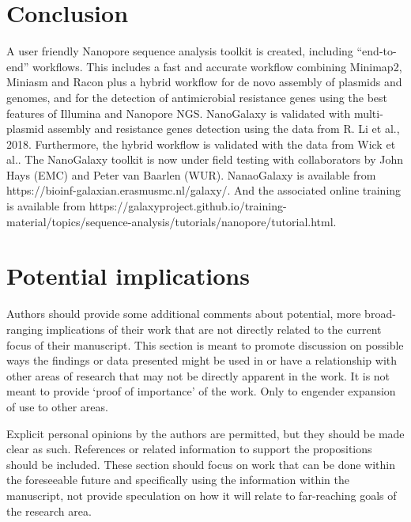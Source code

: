 \documentclass[a4paper,num-refs]{oup-contemporary}
\begin{document}
\section{Conclusion}

A user friendly Nanopore sequence analysis toolkit is created, including “end-to-end” workflows. This includes a fast and accurate workflow combining Minimap2, Miniasm and Racon plus a hybrid workflow for de novo assembly of plasmids and genomes, and for the detection of antimicrobial resistance genes using the best features of Illumina and Nanopore NGS. NanoGalaxy is validated with multi-plasmid assembly and resistance genes detection using the data from R. Li et al., 2018. Furthermore, the hybrid workflow is validated with the data from Wick et al.. The NanoGalaxy toolkit is now under field testing with collaborators by John Hays (EMC) and Peter van Baarlen (WUR). NanaoGalaxy is available from https://bioinf-galaxian.erasmusmc.nl/galaxy/. And the associated online training is available from https://galaxyproject.github.io/training-material/topics/sequence-analysis/tutorials/nanopore/tutorial.html.


\section{Potential implications}

Authors should provide some additional comments about potential, more broad-ranging implications of their work that are not directly related to the current focus of their manuscript. This section is meant to promote discussion on possible ways the findings or data presented might be used in or have a relationship with other areas of research that may not be directly apparent in the work. It is not meant to provide `proof of importance' of the work. Only to engender expansion of use to other areas.

Explicit personal opinions by the authors are permitted, but they should be made clear as such. References or related information to support the propositions should be included. These section should focus on work that can be done within the foreseeable future and specifically using the information within the manuscript, not provide speculation on how it will relate to far-reaching goals of the research area.
\end{document}

